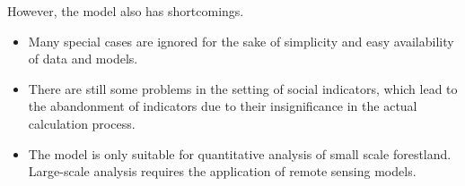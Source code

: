 However, the model also has shortcomings. 
\begin{itemize}
    \item Many special cases are ignored for the sake of simplicity and easy availability of data and models.
    \item There are still some problems in the setting of social indicators, which lead to the abandonment of indicators due to their insignificance in the actual calculation process. 
    \item The model is only suitable for quantitative analysis of small scale forestland. Large-scale analysis requires the application of remote sensing models.
\end{itemize}


